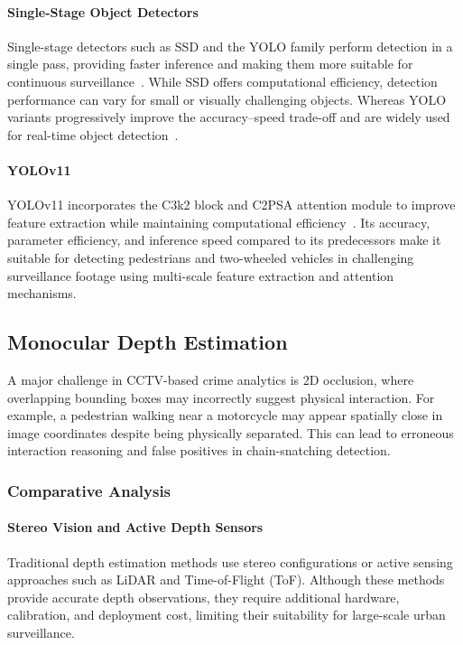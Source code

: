 \documentclass[runningheads]{llncs}
\begin{document}
\paragraph{Single-Stage Object Detectors}
Single-stage detectors such as SSD and the YOLO family perform detection in a single pass, providing faster inference and making them more suitable for continuous surveillance~\cite{ssd,yolo}. While SSD offers computational efficiency, detection performance can
vary for small or visually challenging objects. Whereas YOLO variants progressively improve the accuracy--speed trade-off and are widely used for real-time object detection~\cite{yolov8,yolov10,yolov11}.

\paragraph{YOLOv11}
YOLOv11 incorporates the C3k2 block and C2PSA attention module to improve feature extraction while maintaining computational efficiency~\cite{yolov11}. Its accuracy, parameter efficiency, and inference speed compared to its predecessors make it suitable for detecting pedestrians and two-wheeled vehicles in challenging surveillance footage using multi-scale feature extraction and attention
mechanisms.


\subsection{Monocular Depth Estimation}

A major challenge in CCTV-based crime analytics is 2D occlusion, where overlapping bounding boxes may incorrectly suggest physical interaction. For example, a pedestrian walking near a motorcycle may appear spatially close in image coordinates despite being physically separated. This can lead to erroneous interaction reasoning and false positives in chain-snatching detection.

\subsubsection{Comparative Analysis}

\paragraph{Stereo Vision and Active Depth Sensors}
Traditional depth estimation methods use stereo configurations or active sensing approaches such as LiDAR and Time-of-Flight (ToF). Although these methods provide accurate depth observations, they require additional hardware, calibration, and deployment cost, limiting their suitability for large-scale urban surveillance.
\end{document}
